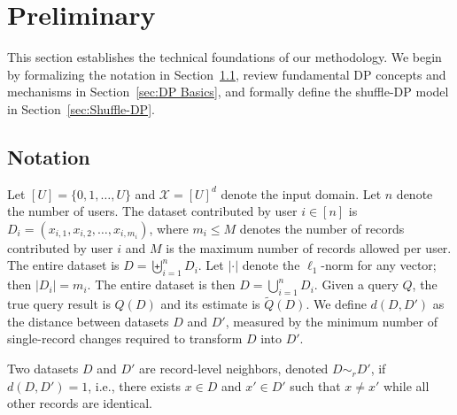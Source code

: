 \section{Preliminary}
\label{sec:Preliminary}


This section establishes the technical foundations of our methodology.
We begin by formalizing the notation in Section~\ref{sec:Notation}, review fundamental DP concepts and mechanisms in Section~\ref{sec:DP Basics}, and formally define the shuffle-DP model in Section~\ref{sec:Shuffle-DP}.



\subsection{Notation}
\label{sec:Notation}


Let $[U] = \{0, 1, \dots, U\}$ and $\mathcal{X} = [U]^d$ denote the input domain. 
Let $n$ denote the number of users. 
The dataset contributed by user $i \in [n]$ is $D_i = (x_{i,1}, x_{i,2}, \ldots, x_{i,m_i})$, where $m_i \leq M$ denotes the number of records contributed by user $i$ and $M$ is the maximum number of records allowed per user. 
The entire dataset is $D = \biguplus_{i=1}^n D_i$.
Let $| \cdot |$ denote the $\ell_1$-norm for any vector; then $| D_i | = m_i$.
The entire dataset is then $D = \bigcup_{i=1}^n D_i$.
Given a query $Q$, the true query result is $Q(D)$ and its estimate is $\tilde{Q}(D)$. 
We define $d(D, D')$ as the distance between datasets $D$ and $D'$, measured by the minimum number of single-record changes required to transform $D$ into $D'$.




\begin{definition}
Two datasets $D$ and $D'$ are record-level neighbors, denoted $D \sim_r D'$, if $d(D, D') = 1$, i.e., there exists $x \in D$ and $x'\in D'$ such that $x \neq x'$ while all other records are identical.
\end{definition}




